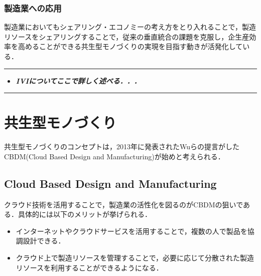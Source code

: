 \hypertarget{ux88fdux9020ux696dux3078ux306eux5fdcux7528}{%
\subsubsection{製造業への応用}\label{ux88fdux9020ux696dux3078ux306eux5fdcux7528}}

製造業においてもシェアリング・エコノミーの考え方をとり入れることで，製造リソースをシェアリングすることで，従来の垂直統合の課題を克服し，企生産効率を高めることができる共生型モノづくりの実現を目指す動きが活発化している\cite{IVI}\cite{Hitachi-csmfg}．

\begin{center}\rule{1.0\linewidth}{0.5pt}\end{center}

\begin{itemize}
\tightlist
\item
  \textbf{\emph{IVIについてここで詳しく述べる．．．}}
\end{itemize}

\begin{center}\rule{1.0\linewidth}{0.5pt}\end{center}

\hypertarget{ux5171ux751fux578bux30e2ux30ceux3065ux304fux308a}{%
\section{共生型モノづくり}\label{ux5171ux751fux578bux30e2ux30ceux3065ux304fux308a}}

共生型モノづくりのコンセプトは，2013年に発表されたWuらの提言がしたCBDM(Cloud
Based Design and Manufacturing)が始めと考えられる\cite{WU2013}．

\hypertarget{cloud-based-design-and-manufacturing}{%
\subsection{Cloud Based Design and
Manufacturing}\label{cloud-based-design-and-manufacturing}}

クラウド技術を活用することで，製造業の活性化を図るのがCBDMの狙いである．具体的には以下のメリットが挙げられる．

\begin{itemize}
\tightlist
\item
  インターネットやクラウドサービスを活用することで，複数の人で製品を協調設計できる．
\item
  クラウド上で製造リソースを管理することで，必要に応じて分散された製造リソースを利用することができるようになる．
\end{itemize}

